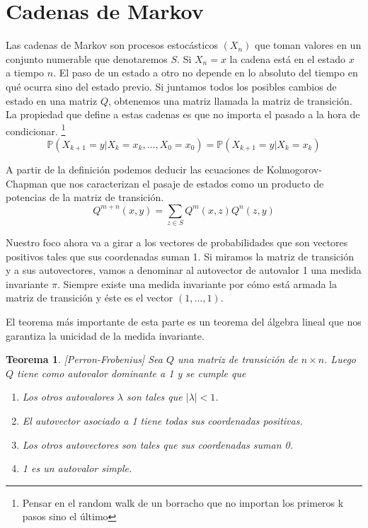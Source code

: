 \documentclass[11pt]{article}
\theoremstyle{plain} %
\newtheorem{teorema}{\color{rojo}Teorema}
\theoremstyle{definition}
\theoremstyle{remark}
\def\P{\mathbb{P}}
\def\blue{\textcolor{blue!60!black}}
\begin{document}
\bigskip
\section{Cadenas de Markov}

Las \blue{cadenas de Markov} son procesos estocásticos $(X_n)$ que toman valores en un conjunto numerable que denotaremos $S$. Si $X_n = x$ la cadena está en el \blue{estado} $x$ a tiempo $n$. El paso de un estado a otro no depende en lo absoluto del tiempo en qué ocurra sino del estado previo. Si juntamos todos los posibles cambios de estado en una matriz $Q$, obtenemos una matriz llamada la \blue{matriz de transición}.
 La propiedad que define a estas cadenas es que no importa el pasado a la hora de condicionar. \footnote{Pensar en el random walk de un borracho que no importan los primeros k pasos sino el último}
\[ \P\left( X_{k+1}=y | X_{k}=x_k , \dots , X_0 = x_0  \right) = \P \left( X_{k+1}=y |  X_{k}=x_k \right)  \] 

A partir de la definición podemos deducir las \blue{ecuaciones de Kolmogorov-Chapman} que nos caracterizan el pasaje de estados como un producto de potencias de la matriz de transición.
\[ Q^{m+n}(x,y) = \sum_{z \in S} Q^{m}(x,z) Q^{n}(z,y) \]

Nuestro foco ahora va a girar a los \blue{vectores de probabilidades} que son vectores positivos tales que sus coordenadas suman 1. Si miramos la matriz de transición y a sus autovectores, vamos a denominar al autovector de autovalor 1 una \blue{medida invariante} $\pi$. Siempre existe una medida invariante por cómo está armada la matriz de transición y éste es el vector $(1,\dots,1)$.

El teorema más importante de esta parte es un teorema del álgebra lineal que nos garantiza la unicidad de la \blue{medida invariante}. 

\begin{teorema}
	\label{teo:perrFrob}
	[Perron-Frobenius]
	Sea $Q$ una matriz de transición de $n \times n$. Luego $Q$ tiene como autovalor dominante a 1 y se cumple que
	\begin{enumerate}
		\item Los otros autovalores $\lambda$ son tales que $|\lambda| < 1$.
		\item El autovector asociado a 1 tiene todas sus coordenadas positivas.
		\item Los otros autovectores son tales que sus coordenadas suman 0.
		\item 1 es un autovalor simple.
	\end{enumerate}
\end{teorema}
\end{document}
